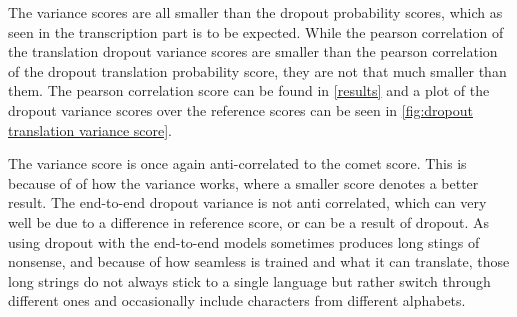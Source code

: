 The variance scores are all smaller than the dropout probability scores, which as seen in the transcription part is to be expected. While the pearson correlation of the translation dropout variance scores are smaller than the pearson correlation of the dropout translation probability score, they are not that much smaller than them. The pearson correlation score can be found in \autoref{results} and a plot of the dropout variance scores over the reference scores can be seen in \autoref{fig:dropout translation variance score}.

The variance score is once again anti-correlated to the comet score. This is because of of how the variance works, where a smaller score denotes a better result. 
The end-to-end dropout variance is not anti correlated, which can very well be due to a difference in reference score, or can be a result of dropout.
As using dropout with the end-to-end models sometimes produces long stings of nonsense, and because of how seamless is trained and what it can translate, those long strings do not always stick to a single language but rather switch through different ones and occasionally include characters from different alphabets. 
